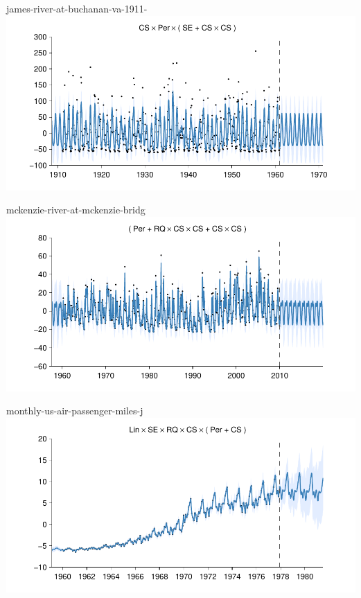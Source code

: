 \begin{frame}{james-river-at-buchanan-va-1911-}
  \center
  \includegraphics[width=1.0\textwidth]{figures/james-river-at-buchanan-va-1911-/james-river-at-buchanan-va-1911-_all}
\end{frame}  
    
\begin{frame}{mckenzie-river-at-mckenzie-bridg}
  \center
  \includegraphics[width=1.0\textwidth]{figures/mckenzie-river-at-mckenzie-bridg/mckenzie-river-at-mckenzie-bridg_all}
\end{frame}  

\begin{frame}{monthly-us-air-passenger-miles-j}
  \center
  \includegraphics[width=1.0\textwidth]{figures/monthly-us-air-passenger-miles-j/monthly-us-air-passenger-miles-j_all}
\end{frame}  

